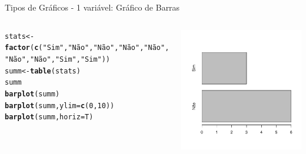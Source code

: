 \documentclass{beamer}\usepackage[]{graphicx}\usepackage[]{color}
\makeatletter
\newcommand{\hlnum}[1]{\textcolor[rgb]{0.686,0.059,0.569}{#1}}%
\newcommand{\hlstr}[1]{\textcolor[rgb]{0.192,0.494,0.8}{#1}}%
\newcommand{\hlstd}[1]{\textcolor[rgb]{0.345,0.345,0.345}{#1}}%
\newcommand{\hlkwb}[1]{\textcolor[rgb]{0.69,0.353,0.396}{#1}}%
\newcommand{\hlkwc}[1]{\textcolor[rgb]{0.333,0.667,0.333}{#1}}%
\newcommand{\hlkwd}[1]{\textcolor[rgb]{0.737,0.353,0.396}{\textbf{#1}}}%
\newenvironment{kframe}{%
 \def\at@end@of@kframe{}%
 \ifinner\ifhmode%
  \def\at@end@of@kframe{\end{minipage}}%
  \begin{minipage}{\columnwidth}%
 \fi\fi%
 \def\FrameCommand##1{\hskip\@totalleftmargin \hskip-\fboxsep
 \colorbox{shadecolor}{##1}\hskip-\fboxsep
     \hskip-\linewidth \hskip-\@totalleftmargin \hskip\columnwidth}%
 \MakeFramed {\advance\hsize-\width
   \@totalleftmargin\z@ \linewidth\hsize
   \@setminipage}}%
 {\par\unskip\endMakeFramed%
 \at@end@of@kframe}
\newenvironment{knitrout}{}{} %
\renewenvironment{knitrout}{\setlength{\topsep}{0mm}}{}
\makeatother
\begin{document}
\begin{frame}[fragile]{Tipos de Gráficos - 1 variável: Gráfico de Barras} 

\begin{columns}[t]

\begin{knitrout}\tiny
{}\color{fgcolor}\begin{kframe}
\begin{alltt}
\hlstd{stats} \hlkwb{<-} \hlkwd{factor}\hlstd{(}\hlkwd{c}\hlstd{(}\hlstr{"Sim"}\hlstd{,}\hlstr{"Não"}\hlstd{,}\hlstr{"Não"}\hlstd{,}\hlstr{"Não"}\hlstd{,}\hlstr{"Não"}\hlstd{,}
                  \hlstr{"Não"}\hlstd{,}\hlstr{"Não"}\hlstd{,}\hlstr{"Sim"}\hlstd{,}\hlstr{"Sim"}\hlstd{))}
\hlstd{summ} \hlkwb{<-} \hlkwd{table}\hlstd{(stats)}
\hlstd{summ}
\hlkwd{barplot}\hlstd{(summ)}
\hlkwd{barplot}\hlstd{(summ,}\hlkwc{ylim}\hlstd{=}\hlkwd{c}\hlstd{(}\hlnum{0}\hlstd{,}\hlnum{10}\hlstd{))}
\hlkwd{barplot}\hlstd{(summ,}\hlkwc{horiz}\hlstd{=T)}
\end{alltt}
\end{kframe}
\end{knitrout}


\begin{knitrout}
\color{fgcolor}
\includegraphics[width=1\linewidth]{figure/unnamed-chunk-51-1} 

\end{knitrout}

\end{columns}

\end{frame}
\end{document}
